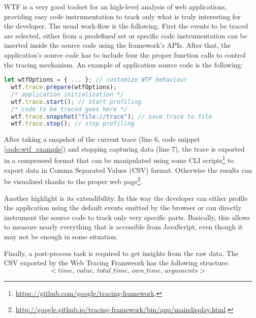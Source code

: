 WTF is a very good toolset for an high-level analysis of web applications,
providing easy code instrumentation to track only what is truly interesting for the developer.
The usual work-flow is the following. First the events to be traced 
are selected, either from a predefined set or specific code instrumentation can be
inserted inside the source code using the framework's APIs. After that, the application's source code
has to include four the proper function calls to control the tracing mechanism.
An example of application source code is the following:
\begin{lstlisting}[caption=Usage example of the Web Tracing Framework., language=JavaScript,
  label=code:wtf_example]
  let wtfOptions = { ... }; // customize WTF behaviour
  wtf.trace.prepare(wtfOptions);
  /* application initialization */
  wtf.trace.start(); // start profiling
  /* code to be traced goes here */
  wtf.trace.snapshot("file://trace"); // save trace to file
  wtf.trace.stop(); // stop profiling
\end{lstlisting}

After taking a snapshot of the current trace (line 6, code snippet \ref{code:wtf_example})
and stopping capturing data (line 7), the trace is exported in a
compressed format that can be manipulated using some CLI
scripts\footnote{\url{https://github.com/google/tracing-framework}.} to export
data in Comma Separated Values (CSV) format. Otherwise the results can be visualized
thanks to the proper web
page\footnote{\url{http://google.github.io/tracing-framework/bin/app/maindisplay.html}.}.

Another highlight is its extendibility. In this way the developer can either
profile the application using the default events emitted by the browser or can 
directly instrument the source code to track only very specific parts. Basically, this
allows to measure nearly everything that is accessible from JavaScript, even
though it may not be enough in some situation.

Finally, a post-process task is required to get insights from the raw data.
The CSV exported by the Web Tracing Framweork has the following structure:
\begin{equation*}
    <time,\,value,\,total\_time,\,own\_time,\,arguments>
\end{equation*}


